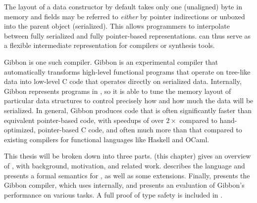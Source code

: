 \documentclass[showabstract,showacknowledgments,showpreface,showdedication]{iuphd}
\theoremstyle{nonumberplain}
\begin{document}
The layout of a \ourcalc data constructor by default takes only one (unaligned)
byte in memory and fields may be referred to \emph{either} by pointer
indirections or unboxed into the parent object (serialized). This allows
programmers to interpolate between fully serialized and fully pointer-based
representations.
%
\ourcalc can thus serve as a flexible intermediate representation for compilers
or synthesis tools.

Gibbon is one such compiler. Gibbon is an experimental compiler that
automatically transforms high-level functional programs that operate on
tree-like data into low-level C code that operates directly on serialized data.
Internally, Gibbon represents programs in \ourcalc, so it is able to tune the
memory layout of particular data structures to control precisely how and how
much the data will be serialized. In general, Gibbon produces code that is often
significantly faster than equivalent pointer-based code, with speedups of over
$2\times$ compared to hand-optimized, pointer-based C code, and often much more
than that compared to existing compilers for functional languages like Haskell
and OCaml.


This thesis will be broken down into three parts.  (this
chapter) gives an overview of \ourcalc, with background, motivation, and related
work.  describes the language and presents a formal
semantics for \ourcalc, as well as some extensions. Finally,
 presents the Gibbon compiler, which uses \ourcalc
internally, and presents an evaluation of Gibbon's performance on various tasks.
A full proof of type safety is included in .



\end{document}
